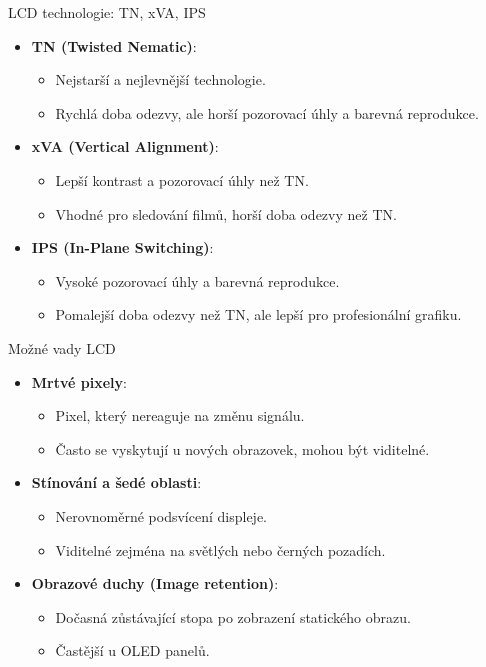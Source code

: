 \documentclass[aspectratio=43]{beamer}
\begin{document}
\begin{frame}{LCD technologie: TN, xVA, IPS}
    \begin{itemize}
        \item \textbf{TN (Twisted Nematic)}:
        \begin{itemize}
            \item Nejstarší a nejlevnější technologie.
            \item Rychlá doba odezvy, ale horší pozorovací úhly a barevná reprodukce.
        \end{itemize}
        \item \textbf{xVA (Vertical Alignment)}:
        \begin{itemize}
            \item Lepší kontrast a pozorovací úhly než TN.
            \item Vhodné pro sledování filmů, horší doba odezvy než TN.
        \end{itemize}
        \item \textbf{IPS (In-Plane Switching)}:
        \begin{itemize}
            \item Vysoké pozorovací úhly a barevná reprodukce.
            \item Pomalejší doba odezvy než TN, ale lepší pro profesionální grafiku.
        \end{itemize}
    \end{itemize}
\end{frame}

\begin{frame}{Možné vady LCD}
    \begin{itemize}
        \item \textbf{Mrtvé pixely}:
        \begin{itemize}
            \item Pixel, který nereaguje na změnu signálu.
            \item Často se vyskytují u nových obrazovek, mohou být viditelné.
        \end{itemize}
        \item \textbf{Stínování a šedé oblasti}:
        \begin{itemize}
            \item Nerovnoměrné podsvícení displeje.
            \item Viditelné zejména na světlých nebo černých pozadích.
        \end{itemize}
        \item \textbf{Obrazové duchy (Image retention)}:
        \begin{itemize}
            \item Dočasná zůstávající stopa po zobrazení statického obrazu.
            \item Častější u OLED panelů.
        \end{itemize}
    \end{itemize}
\end{frame}
\end{document}
